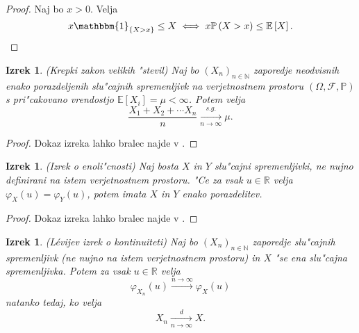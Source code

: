 \documentclass[12pt, a4paper, reqno]{amsart}
\theoremstyle{definition}
\theoremstyle{plain}
\newtheorem{izrek}[definicija]{Izrek}
\newcommand{\R}{\mathbb{R}}
\newcommand{\N}{\mathbb{N}}
\newcommand{\E}{\mathbb{E}}
\newcommand{\Prob}{\mathbb{P}}
\newcommand{\1}{\mathds{1}}
\begin{document}
    \begin{proof}
        Naj bo $x > 0$. Velja
        \begin{equation*}
            x\mathbbm{1}_{\{X > x\}} \leq X \iff x\Prob\left(X > x\right) \leq \E\left[X\right].
        \end{equation*}
    \end{proof}

    \begin{izrek}(Krepki zakon velikih "stevil)
        Naj bo $(X_n)_{n\in\N}$ zaporedje neodvisnih enako porazdeljenih
        slu"cajnih spremenljivk na verjetnostnem prostoru $(\Omega, \mathcal{F}, \Prob)$
         s pri"cakovano vrendostjo $\E\left[X_i\right] = \mu <\infty$. Potem velja
        \begin{equation*}
            \frac{X_1 + X_2 + \cdots X_n}{n}\xrightarrow[n\to\infty]{s.g.} \mu.
        \end{equation*}
        \label{izr:KrepkiZakonVelikihStevil}
    \end{izrek}

    \begin{proof}
        Dokaz izreka lahko bralec najde v \cite{7}.
    \end{proof}

    \begin{izrek}(Izrek o enoli"cnosti)
        Naj bosta $X$ in $Y$ slu"cajni spremenljivki, ne nujno definirani na istem verjetnostnem prostoru.
        "Ce za vsak $u\in\R$ velja $\varphi_X(u) = \varphi_Y(u)$, potem imata $X$ in $Y$ enako porazdelitev.
        \label{izr:enolicnost}
    \end{izrek}

    \begin{proof}
        Dokaz izreka lahko bralec najde v \cite{7}.
    \end{proof}

    \begin{izrek}(Lévijev izrek o kontinuiteti)
        Naj bo $(X_n)_{n\in\N}$ zaporedje slu"cajnih spremenljivk (ne nujno na istem verjetnostnem prostoru)
        in $X$ "se ena slu"cajna spremenljivka. Potem za vsak $u\in\R$ velja
        \begin{equation*}
            \varphi_{X_n}(u) \xrightarrow{n\to\infty} \varphi_X(u) 
        \end{equation*}
        natanko tedaj, ko velja
        \begin{equation*}
            X_n \xrightarrow[n\to\infty]{d} X.
        \end{equation*}
        \label{izr:LevijevIzrek}
    \end{izrek}
\end{document}
